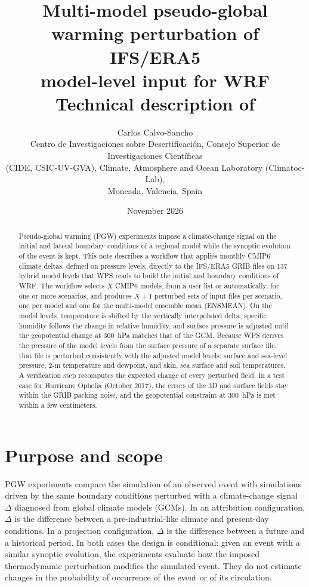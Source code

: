 \documentclass[11pt,a4paper]{article}
\title{\textbf{Multi-model pseudo-global warming perturbation of IFS/ERA5\\
model-level input for WRF}\\[4pt]
\large Technical description of \code{pgw\_workflow\_ModelLevels\_WRF}}
\author{Carlos Calvo-Sancho\\[4pt]
\small Centro de Investigaciones sobre Desertificaci\'on, Consejo Superior de Investigaciones Cient\'ificas\\
\small (CIDE, CSIC-UV-GVA), Climate, Atmosphere and Ocean Laboratory (Climatoc-Lab),\\
\small Moncada, Valencia, Spain}
\date{November 2026}
\begin{document}
\maketitle
\thispagestyle{fancy}

\begin{abstract}
\noindent
Pseudo-global warming (PGW) experiments impose a climate-change signal on the
initial and lateral boundary conditions of a regional model while the
synoptic evolution of the event is kept. This note describes a workflow that
applies monthly CMIP6 climate deltas, defined on pressure levels, directly to
the IFS/ERA5 GRIB files on 137 hybrid model levels that WPS reads to build
the initial and boundary conditions of WRF. The workflow selects $X$ CMIP6
models, from a user list or automatically, for one or more scenarios, and
produces $X+1$ perturbed sets of input files per scenario, one per model and
one for the multi-model ensemble mean (ENSMEAN). On the model levels,
temperature is shifted by the vertically interpolated delta, specific
humidity follows the change in relative humidity, and surface pressure is
adjusted until the geopotential change at \SI{300}{hPa} matches that of the
GCM. Because WPS derives the pressure of the model levels from the surface
pressure of a separate surface file, that file is perturbed consistently with
the adjusted model levels: surface and sea-level pressure, 2-m temperature
and dewpoint, and skin, sea surface and soil temperatures. A verification
step recomputes the expected change of every perturbed field. In a test case
for Hurricane Ophelia (October 2017), the errors of the 3D and surface fields
stay within the GRIB packing noise, and the geopotential constraint at
\SI{300}{hPa} is met within a few centimeters.
\end{abstract}

\tableofcontents
\newpage

\section{Purpose and scope}
\label{sec:intro}

PGW experiments \citep{Schar1996,Brogli2023} compare the simulation of an
observed event with simulations driven by the same boundary conditions
perturbed with a climate-change signal $\Delta$ diagnosed from global climate
models (GCMs). In an attribution configuration, $\Delta$ is the difference
between a pre-industrial-like climate and present-day conditions. In a
projection configuration, $\Delta$ is the difference between a future and a
historical period. In both cases the design is conditional: given an event
with a similar synoptic evolution, the experiments evaluate how the imposed
thermodynamic perturbation modifies the simulated event. They do not estimate
changes in the probability of occurrence of the event or of its circulation.
\end{document}
